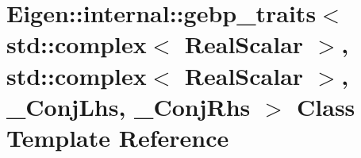 \hypertarget{class_eigen_1_1internal_1_1gebp__traits_3_01std_1_1complex_3_01_real_scalar_01_4_00_01std_1_1com3fbe501975c876a010def81ad2701521}{}\section{Eigen\+::internal\+::gebp\+\_\+traits$<$ std\+::complex$<$ Real\+Scalar $>$, std\+::complex$<$ Real\+Scalar $>$, \+\_\+\+Conj\+Lhs, \+\_\+\+Conj\+Rhs $>$ Class Template Reference}
\label{class_eigen_1_1internal_1_1gebp__traits_3_01std_1_1complex_3_01_real_scalar_01_4_00_01std_1_1com3fbe501975c876a010def81ad2701521}
